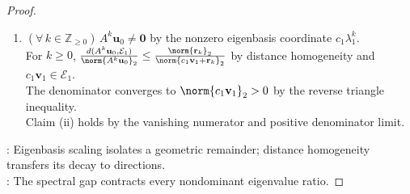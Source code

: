 \begin{theorem}
\begin{proof}
\begin{enumerate}[label=(\roman*)]
\item $(\forall\,k\in\mathbb{Z}_{\geq0})\,A^k\mathbf{u}_0\neq\mathbf{0}$ by the nonzero eigenbasis coordinate $c_1\lambda_1^k$.\\
For $k\geq0$, $\frac{d(A^k\mathbf{u}_0,\mathcal{E}_1)}{\norm{A^k\mathbf{u}_0}_2}\leq\frac{\norm{\mathbf{r}_k}_2}{\norm{c_1\mathbf{v}_1+\mathbf{r}_k}_2}$ by distance homogeneity and $c_1\mathbf{v}_1\in\mathcal{E}_1$.\\
The denominator converges to $\norm{c_1\mathbf{v}_1}_2>0$ by the reverse triangle inequality.\\
Claim (ii) holds by the vanishing numerator and positive denominator limit.
\end{enumerate}
: Eigenbasis scaling isolates a geometric remainder; distance homogeneity transfers its decay to directions.\\
: The spectral gap contracts every nondominant eigenvalue ratio.
\end{proof}
\end{theorem}

